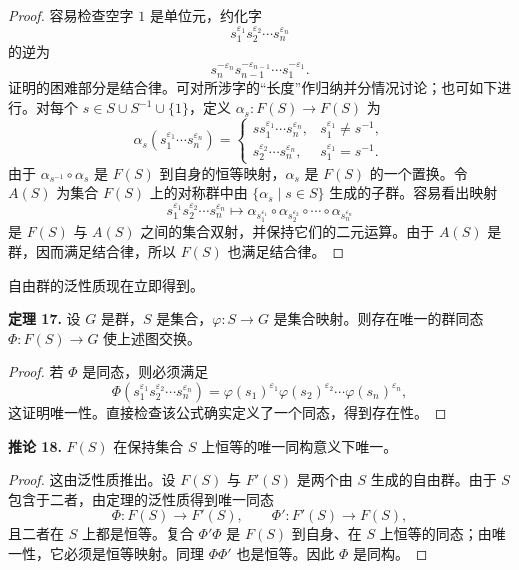 \begin{proof}
容易检查空字 $1$ 是单位元，约化字
\[
  s_1^{\varepsilon_1}s_2^{\varepsilon_2}\cdots s_n^{\varepsilon_n}
\]
的逆为
\[
  s_n^{-\varepsilon_n}s_{n-1}^{-\varepsilon_{n-1}}\cdots s_1^{-\varepsilon_1}.
\]
证明的困难部分是结合律。可对所涉字的“长度”作归纳并分情况讨论；也可如下进行。对每个 $s\in S\cup S^{-1}\cup\{1\}$，定义 $\alpha_s:F(S)\to F(S)$ 为
\[
\alpha_s(s_1^{\varepsilon_1}\cdots s_n^{\varepsilon_n})=
\begin{cases}
 ss_1^{\varepsilon_1}\cdots s_n^{\varepsilon_n}, & s_1^{\varepsilon_1}\neq s^{-1},\\[1mm]
 s_2^{\varepsilon_2}\cdots s_n^{\varepsilon_n}, & s_1^{\varepsilon_1}=s^{-1}.
\end{cases}
\]
由于 $\alpha_{s^{-1}}\circ\alpha_s$ 是 $F(S)$ 到自身的恒等映射，$\alpha_s$ 是 $F(S)$ 的一个置换。令 $A(S)$ 为集合 $F(S)$ 上的对称群中由 $\{\alpha_s\mid s\in S\}$ 生成的子群。容易看出映射
\[
  s_1^{\varepsilon_1}s_2^{\varepsilon_2}\cdots s_n^{\varepsilon_n}
  \longmapsto
  \alpha_{s_1^{\varepsilon_1}}\circ\alpha_{s_2^{\varepsilon_2}}\circ\cdots\circ\alpha_{s_n^{\varepsilon_n}}
\]
是 $F(S)$ 与 $A(S)$ 之间的集合双射，并保持它们的二元运算。由于 $A(S)$ 是群，因而满足结合律，所以 $F(S)$ 也满足结合律。
\end{proof}

自由群的泛性质现在立即得到。

\medskip
\noindent\textbf{定理 17.} 设 $G$ 是群，$S$ 是集合，$\varphi:S\to G$ 是集合映射。则存在唯一的群同态 $\Phi:F(S)\to G$ 使上述图交换。

\begin{proof}
若 $\Phi$ 是同态，则必须满足
\[
  \Phi(s_1^{\varepsilon_1}s_2^{\varepsilon_2}\cdots s_n^{\varepsilon_n})
  =\varphi(s_1)^{\varepsilon_1}\varphi(s_2)^{\varepsilon_2}\cdots\varphi(s_n)^{\varepsilon_n},
\]
这证明唯一性。直接检查该公式确实定义了一个同态，得到存在性。
\end{proof}

\medskip
\noindent\textbf{推论 18.} $F(S)$ 在保持集合 $S$ 上恒等的唯一同构意义下唯一。

\begin{proof}
这由泛性质推出。设 $F(S)$ 与 $F'(S)$ 是两个由 $S$ 生成的自由群。由于 $S$ 包含于二者，由定理的泛性质得到唯一同态
\[
  \Phi:F(S)\to F'(S),
  \qquad
  \Phi':F'(S)\to F(S),
\]
且二者在 $S$ 上都是恒等。复合 $\Phi'\Phi$ 是 $F(S)$ 到自身、在 $S$ 上恒等的同态；由唯一性，它必须是恒等映射。同理 $\Phi\Phi'$ 也是恒等。因此 $\Phi$ 是同构。
\end{proof}

